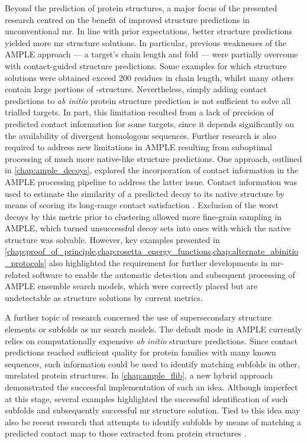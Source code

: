 Beyond the prediction of protein structures, a major focus of the presented research centred on the benefit of improved structure predictions in unconventional \gls{mr}. In line with prior expectations, better structure predictions yielded more \gls{mr} structure solutions. In particular, previous weaknesses of the AMPLE approach --- a target's chain length and fold --- were partially overcome with contact-guided structure predictions. Some examples for which structure solutions were obtained exceed 200 residues in chain length, whilst many others contain large portions of \textbeta-structure. Nevertheless, simply adding contact predictions to \textit{ab initio} protein structure prediction is not sufficient to solve all trialled targets. In part, this limitation resulted from a lack of precision of predicted contact information for some targets, since it depends significantly on the availability of divergent homologous sequences. Further research is also required to address new limitations in AMPLE resulting from suboptimal processing of much more native-like structure predictions. One approach, outlined in \cref{chap:ample_decoys}, explored the incorporation of contact information in the AMPLE processing pipeline to address the latter issue. Contact information was used to estimate the similarity of a predicted decoy to its native structure by means of scoring its long-range contact satisfaction \cite{Kosciolek2014-bt,De_Oliveira2017-gj,Adhikari2018-lj}. Exclusion of the worst decoys by this metric prior to clustering allowed more fine-grain sampling in AMPLE, which turned unsuccessful decoy sets into ones with which the native structure was solvable. However, key examples presented in \cref{chap:proof_of_principle,chap:rosetta_energy_functions,chap:alternate_abinitio_protocols} also highlighted the requirement for further developments in \gls{mr}-related software to enable the automatic detection and subsequent processing of AMPLE ensemble search models, which were correctly placed but are undetectable as structure solutions by current metrics.

A further topic of research concerned the use of supersecondary structure elements or subfolds as \gls{mr} search models. The default mode in AMPLE currently relies on computationally expensive \textit{ab initio} structure predictions. Since contact predictions reached sufficient quality for protein families with many known sequences, such information could be used to identify matching subfolds in other, unrelated protein structures. In \cref{chap:ample_flib}, a new hybrid approach demonstrated the successful implementation of such an idea. Although imperfect at this stage, several examples highlighted the successful identification of such subfolds and subsequently successful \gls{mr} structure solution. Tied to this idea may also be recent research that attempts to identify subfolds by means of matching a predicted contact map to those extracted from protein structures \cite{Buchan2017-ox,Ovchinnikov2017-nd}. 

